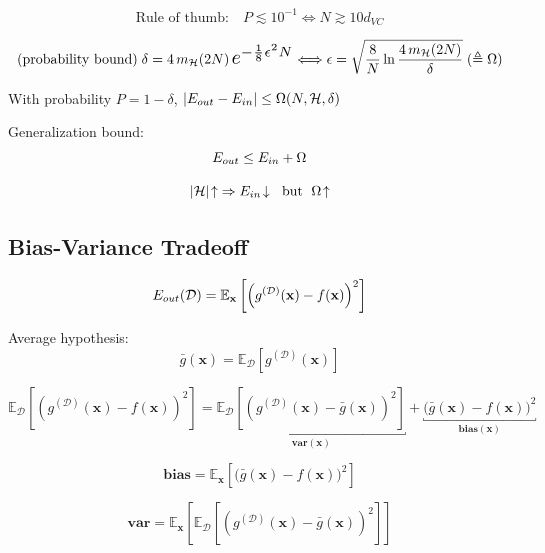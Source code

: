 \documentclass[a4paper,11pt]{article}
\renewcommand{\vec}[1]{\mathbf{#1}}
\begin{document}
\[ \text{Rule of thumb:}\quad P \lesssim 10^{-1} \Longleftrightarrow N \gtrsim 10 d_{VC} \]

\[ \text{(probability bound)} \;
   \delta = 4 \, \iimH(2N) \, \scalebox{1.4}{$ e^{-\frac18 \epsilon^2 N} $}
   \Longleftrightarrow
   \epsilon = \sqrt{ \frac{8}{N} \ln{ \frac{ 4 \, \iimH(2N) }{\delta} } }
   \; (\triangleq \Omega) \]

With probability $P = 1 - \delta$, $\left| E_{out} - E_{in} \right| \leq \Omega(N,\mathcal{H},\delta)$

Generalization bound: \[ E_{out} \leq E_{in} + \Omega \]

\[ |\mathcal{H}| \!\uparrow \; \Rightarrow E_{in} \!\downarrow \;\text{ but }\; \Omega \!\uparrow  \]

\subsection{Bias-Variance Tradeoff}

\def\iiD{\mathcal{D}}
\def\iiE{\mathbb{E}}
\def\iix{\vec{x}}
\def\iiEx{\iiE_\iix}
\def\iiED{\iiE_\iiD}
\def\iifx{f(\iix)}
\def\iigDx{g^{(\iiD)}(\iix)}
\def\iigBarx{\bar{g}(\iix)}
\def\iivar{\mathbf{var}}
\def\iibias{\mathbf{bias}}

\[ \iiEout(\iiD) = \iiEx \left[ \left( \iigDx - \iifx \right)^2 \right] \]

Average hypothesis: \[ \iigBarx = \iiED \left[ \iigDx \right] \]

\[ \iiED \left[ \left( \iigDx - \iifx \right)^2 \right] =
   \underbracket{ \iiED \left[ \left( \iigDx - \iigBarx \right)^2 \right] }_{ \iivar(\iix) }
   + \underbracket{ \big( \iigBarx - \iifx \big)^2 }_{ \iibias(\iix) } \]

\[ \iibias = \iiEx \left[ \big( \iigBarx - \iifx \big)^2 \right] \]

\[ \iivar = \iiEx \left[ \iiED \left[ \left( \iigDx - \iigBarx \right)^2 \right] \right] \]
\end{document}
